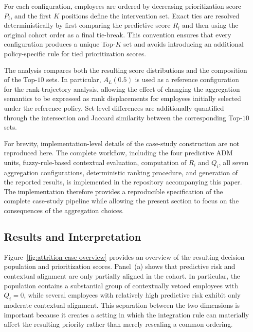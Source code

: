 \documentclass[mathematics,article,submit,moreauthors]{Definitions/mdpi}
\begin{document}
For each configuration, employees are ordered by decreasing prioritization
score $P_i$, and the first $K$ positions define the intervention set. Exact
ties are resolved deterministically by first comparing the predictive score
$R_i$ and then using the original cohort order as a final tie-break. This
convention ensures that every configuration produces a unique Top-$K$ set
and avoids introducing an additional policy-specific rule for tied
prioritization scores.

The analysis compares both the resulting score distributions and the
composition of the Top-$10$ sets. In particular, $A_L(0.5)$ is used as a
reference configuration for the rank-trajectory analysis, allowing the
effect of changing the aggregation semantics to be expressed as rank
displacements for employees initially selected under the reference policy.
Set-level differences are additionally quantified through the intersection
and Jaccard similarity between the corresponding Top-$10$ sets.

For brevity, implementation-level details of the case-study construction are
not reproduced here. The complete workflow, including the four predictive
ADM units, fuzzy-rule-based contextual evaluation, computation of $R_i$ and
$Q_i$, all seven aggregation configurations, deterministic ranking
procedure, and generation of the reported results, is implemented in the
repository accompanying this paper. The implementation therefore provides
a reproducible specification of the complete case-study pipeline while
allowing the present section to focus on the consequences of the
aggregation choices.

\subsection{Results and Interpretation}
\label{sec:results-and-interpretation}

Figure~\ref{fig:attrition-case-overview} provides an overview of the
resulting decision population and prioritization scores. Panel~(a) shows
that predictive risk and contextual alignment are only partially aligned
in the cohort. In particular, the population contains a substantial group
of contextually vetoed employees with $Q_i=0$, while several employees with
relatively high predictive risk exhibit only moderate contextual alignment.
This separation between the two dimensions is important because it creates
a setting in which the integration rule can materially affect the resulting
priority rather than merely rescaling a common ordering.
\end{document}
